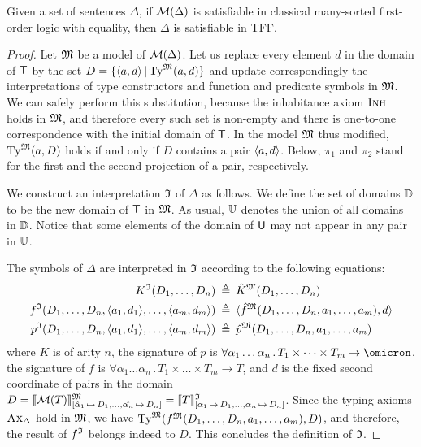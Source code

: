 \begin{theorem} \label{thm:mon_compl}
Given a set of sentences $\Delta$, if $\mathcal{M}(\Delta)$
is satisfiable in classical many-sorted first-order logic
with equality, then $\Delta$ is satisfiable in TFF.
\end{theorem}
\begin{proof}
Let $\mathfrak{M}$ be a model of $\mathcal{M}(\Delta)$. Let us replace every element $d$ in
the domain of $\mathsf{T}$ by the set $D = \{\langle a,d \rangle \,|\, \mathrm{Ty}^{\mathfrak{M}}(a,d)\}$
and update correspondingly the interpretations of type constructors
and function and predicate symbols in $\mathfrak{M}$.
We can safely perform this substitution, because the inhabitance
axiom $\text{\sc Inh}$ holds in $\mathfrak{M}$, and therefore every such set is non-empty
and there is one-to-one correspondence with the initial domain of $\mathsf{T}$.
In the model $\mathfrak{M}$ thus modified, $\mathrm{Ty}^{\mathfrak{M}}(a,D)$ holds if and only if
$D$ contains a pair $\langle a,d \rangle$.
%
Below, $\pi_1$ and $\pi_2$ stand for the first and the second projection
of a pair, respectively.

We construct an interpretation $\mathfrak{I}$ of $\Delta$ as follows.
We define the set of domains $\mathbb{D}$ to be the new domain
of $\mathsf{T}$ in $\mathfrak{M}$. As usual, $\mathbb{U}$ denotes the union
of all domains in $\mathbb{D}$. Notice that some elements of
the domain of $\mathsf{U}$ may not appear in any pair in $\mathbb{U}$.

The symbols of $\Delta$ are interpreted in $\mathfrak{I}$
according to the following equations:
\begin{align*}
K^{\mathfrak{I}}(D_1,\dots,D_n) &\:\triangleq\: \hat{K}^{\mathfrak{M}}(D_1,\dots,D_n) \\
f^{\mathfrak{I}}(D_1,\dots,D_n,\langle a_1,d_1 \rangle,\dots,\langle a_m,d_m \rangle) &\:\triangleq\:
\langle \hat{f}^{\mathfrak{M}}(D_1,\dots,D_n,a_1,\dots,a_m), d \rangle \\
p^{\mathfrak{I}}(D_1,\dots,D_n,\langle a_1,d_1 \rangle,\dots,\langle a_m,d_m \rangle) &\:\triangleq\:
\hat{p}^{\mathfrak{M}}(D_1,\dots,D_n,a_1,\dots,a_m)
\end{align*}
where
$K$ is of arity $n$,
the signature of $p$ is
$\forall \alpha_1\dots\alpha_n \,.\, T_1 \times \dots \times T_m \to
\omicron$,
the signature of $f$ is
$\forall \alpha_1\dots\alpha_n \,.\, T_1 \times \dots \times T_m \to T$,
and $d$ is the fixed second coordinate of pairs in the domain
$D = \llbracket \mathcal{M}(T) \rrbracket^{\mathfrak{M}}_{[\hat{\alpha}_1\,\mapsto\,D_1,\dots,
\hat{\alpha_n}\,\mapsto\,D_n]} =
\llbracket T \rrbracket^{\mathfrak{I}}_{[\alpha_1\,\mapsto\,D_1,\dots,\alpha_n\,\mapsto\,D_n]}$.
Since the typing axioms $\text{\sc Ax}_{\Delta}$ hold in $\mathfrak{M}$, we have
$\mathrm{Ty}^{\mathfrak{M}}(f^{\mathfrak{M}}(D_1,\dots,D_n,a_1,\dots,a_m), D)$,
and therefore, the result of $f^{\mathfrak{I}}$ belongs indeed to $D$.
This concludes the definition of $\mathfrak{I}$.


\end{proof}
